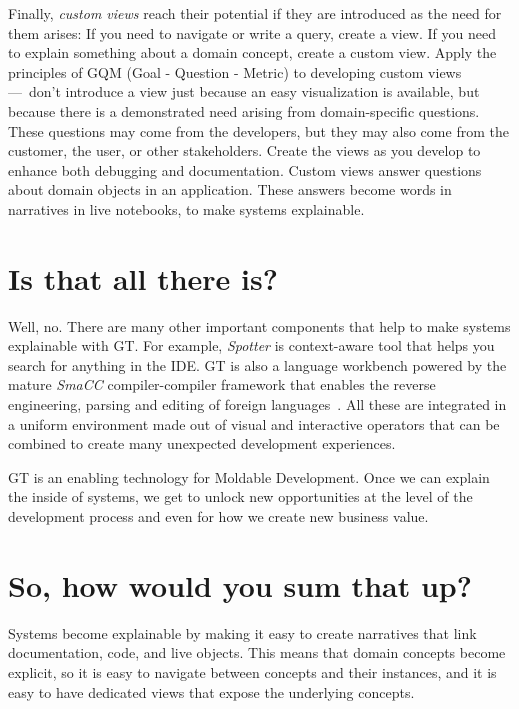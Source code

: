 \documentclass[conference]{IEEEtran}
\begin{document}
Finally, \emph{custom views} reach their potential if they are introduced as the need for them arises:
If you need to navigate or write a query, create a view.
If you need to explain something about a domain concept, create a custom view.
Apply the principles of GQM (Goal - Question - Metric) to developing custom views --- don't introduce a view just because an easy visualization is available, but because there is a demonstrated need arising from domain-specific questions.
These questions may come from the developers, but they may also come from the customer, the user, or other stakeholders.
Create the views as you develop to enhance both debugging and documentation.
Custom views answer questions about domain objects in an application. 
These answers become words in narratives in live notebooks, to make systems explainable.

\section*{Is that all there is?}

Well, no.
There are many other important components that help to make systems explainable with GT.
For example, \emph{Spotter}\cite{Chis16a} is context-aware tool that helps you search for anything in the IDE.
GT is also a language workbench powered by the mature \emph{SmaCC} compiler-compiler framework that enables the reverse engineering, parsing and editing of foreign languages~\cite{Bran17a}.
All these are integrated in a uniform environment made out of visual and interactive operators that can be combined to create many unexpected development experiences.

GT is an enabling technology for Moldable Development.
Once we can explain the inside of systems, we get to unlock new opportunities at the level of the development process and even for how we create new business value.

\section*{So, how would you sum that up?}

Systems become explainable by making it easy to create narratives that link documentation, code, and live objects.
This means that domain concepts become explicit, so it is easy to navigate between concepts and their instances, and it is easy to have dedicated views that expose the underlying concepts.
\end{document}
